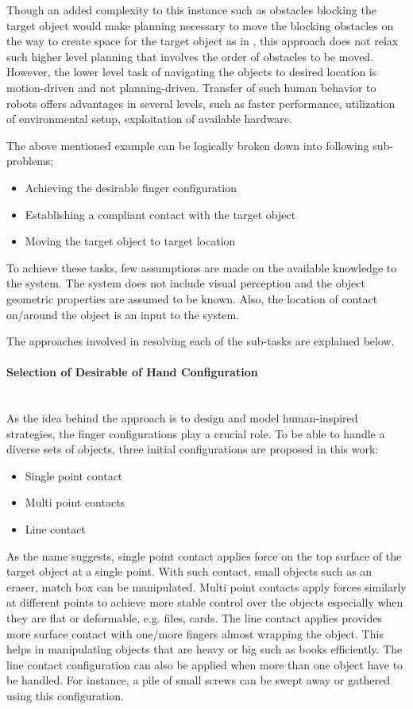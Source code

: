 \documentclass[rnd]{mas_proposal}
\begin{document}
Though an added complexity to this instance such as obstacles blocking the target object would make planning necessary to move the blocking obstacles on the way to create space for the target object as in \cite{dogar2011framework}, this approach does not relax such higher level planning that involves the order of obstacles to be moved. However, the lower level task of navigating the objects to desired location is motion-driven and not planning-driven. Transfer of such human behavior to robots offers advantages in several levels, such as faster performance, utilization of environmental setup, exploitation of available hardware. 

The above mentioned example can be logically broken down into following sub-problems;
\begin{itemize}
	\item Achieving the desirable finger configuration
	\item Establishing a compliant contact with the target object
	\item Moving the target object to target location
\end{itemize}
To achieve these tasks, few assumptions are made on the available knowledge to the system. The system does not include visual perception and the object geometric properties are assumed to be known. Also, the location of contact on/around the object is an input to the system.

The approaches involved in resolving each of the sub-tasks are explained below.

\paragraph{Selection of Desirable of Hand Configuration}~\\
As the idea behind the approach is to design and model human-inspired strategies, the finger configurations play a crucial role. To be able to handle a diverse sets of objects, three initial configurations are proposed in this work:
\begin{itemize}
	\item Single point contact
	\item Multi point contacts
	\item Line contact
\end{itemize}
As the name suggests, single point contact applies force on the top surface of the target object at a single point. With such contact, small objects such as an eraser, match box can be manipulated. Multi point contacts apply forces similarly at different points to achieve more stable control over the objects especially when they are flat or deformable, e.g. files, cards. The line contact applies provides more surface contact with one/more fingers almost wrapping the object. This helps in manipulating objects that are heavy or big such as books efficiently. The line contact configuration can also be applied when more than one object have to be handled. For instance, a pile of small screws can be swept away or gathered using this configuration. 
\end{document}
